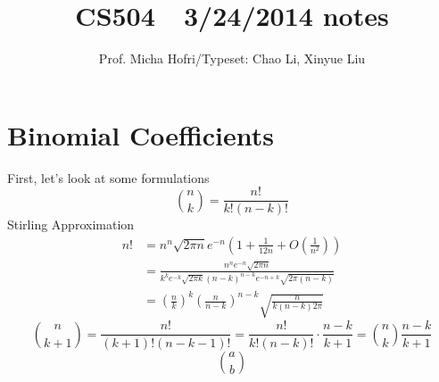 \documentclass[11pt]{article}
\author{Prof. Micha Hofri/Typeset:  Chao Li, Xinyue Liu}
\title{CS504\ \  3/24/2014 notes}
\begin{document}
\maketitle
\section*{Binomial Coefficients}
First, let's look at some formulations \\
\[
\binom{n}{k}=\frac{n!}{k!(n-k)!}
\]
Stirling Approximation \\
\begin{align*}
n!&=n^n\sqrt{2\pi n}e^{-n}\left(1+\frac{1}{12n}+O\left(\frac{1}{n^2}\right)\right) \\
&=\frac{n^ne^{-n}\sqrt{2\pi n}}{k^ke^{-k}\sqrt{2\pi k}(n-k)^{n-k}e^{-n+k}\sqrt{2\pi (n-k)}} \\
&=\left(\frac{n}{k}\right)^k\left(\frac{n}{n-k}\right)^{n-k}\sqrt{\frac{n}{k(n-k)2\pi}}
\end{align*}
\[
\binom{n}{k+1}=\frac{n!}{(k+1)!(n-k-1)!}=\frac{n!}{k!(n-k)!}\cdot \frac{n-k}{k+1}=\binom{n}{k}\frac{n-k}{k+1}
\]
\[
\binom{a}{b}
\]
\end{document}
